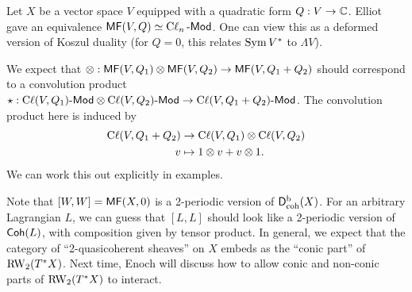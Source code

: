 \documentclass{article}
\begin{document}
\begin{ex}
	Let $X$ be a vector space $V$ equipped with a quadratic form $Q: V \to \mathbb{C}$.
	Elliot gave an equivalence $\mathsf{MF}(V, Q) \simeq \operatorname{C\ell}_n\text{-}\mathsf{Mod}$.
	One can view this as a deformed version of Koszul duality (for $Q = 0$, this relates $\operatorname{Sym} V^*$ to $\Lambda V$).
	
	We expect that $\otimes: \mathsf{MF}(V, Q_1) \otimes \mathsf{MF}(V, Q_2) \to \mathsf{MF}(V, Q_1 + Q_2)$ should correspond to a convolution product $\star: \operatorname{C\ell}(V, Q_1)\text{-}\mathsf{Mod} \otimes \operatorname{C\ell}(V, Q_2)\text{-}\mathsf{Mod} \to \operatorname{C\ell}(V, Q_1 + Q_2)\text{-}\mathsf{Mod}$.
	The convolution product here is induced by
	\begin{align*}
		\operatorname{C\ell}(V, Q_1 + Q_2) &\to \operatorname{C\ell}(V, Q_1) \otimes \operatorname{C\ell}(V, Q_2) \\
		v &\mapsto 1 \otimes v + v \otimes 1.
	\end{align*}
	We can work this out explicitly in examples.
\end{ex}

Note that $[W, W] = \mathsf{MF}(X, 0)$ is a 2-periodic version of $\mathsf{D}^\mathrm{b}_{\mathrm{coh}}(X)$.
For an arbitrary Lagrangian $L$, we can guess that $[L, L]$ should look like a 2-periodic version of $\mathsf{Coh}(L)$, with composition given by tensor product.
In general, we expect that the category of ``2-quasicoherent sheaves'' on $X$ embeds as the ``conic part'' of $\operatorname{RW}_2(T^* X)$.
Next time, Enoch will discuss how to allow conic and non-conic parts of $\operatorname{RW}_2(T^* X)$ to interact.
\end{document}
